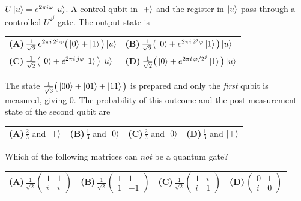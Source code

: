 \documentclass[11pt,a4paper]{article}
\newcommand{\optlabel}[1]{\textbf{(#1)}}
\newenvironment{qitem}[1]{\begin{list}{}{\setlength{\leftmargin}{3.3em}\setlength{\labelwidth}{3.1em}%
  \setlength{\labelsep}{0.2em}\setlength{\topsep}{3pt}\setlength{\parsep}{3pt}}\item[\textbf{Q.#1}\hfill]}{\end{list}}
\newcommand{\qsep}{\par\vspace{2pt}{\color{black!15}\hrule}\vspace{4pt}}
\begin{document}
\begin{qitem}{28}
$U\ket{u} = e^{2\pi i\varphi}\ket{u}$. A control qubit in $\ket{+}$ and the register in $\ket{u}$ pass through a
controlled-$U^{2^j}$ gate. The output state is
\par\smallskip\noindent\begin{tabularx}{\linewidth}{@{}*{2}{L}@{}}
\optlabel{A}\,$\frac{1}{\sqrt2}\,e^{2\pi i\,2^j\varphi}\big(\ket0 + \ket1\big)\ket{u}$ & \optlabel{B}\,$\frac{1}{\sqrt2}\big(\ket0 + e^{2\pi i\,2^j\varphi}\ket1\big)\ket{u}$ \\[3pt]
\optlabel{C}\,$\frac{1}{\sqrt2}\big(\ket0 + e^{2\pi i\,j\varphi}\ket1\big)\ket{u}$ & \optlabel{D}\,$\frac{1}{\sqrt2}\big(\ket0 + e^{2\pi i\,\varphi/2^j}\ket1\big)\ket{u}$
\end{tabularx}
\end{qitem}
\qsep

\begin{qitem}{29}
The state $\frac{1}{\sqrt3}\big(\ket{00} + \ket{01} + \ket{11}\big)$ is prepared and only the \emph{first} qubit is
measured, giving $0$. The probability of this outcome and the post-measurement state of the second qubit are
\par\smallskip\noindent\begin{tabularx}{\linewidth}{@{}*{4}{L}@{}}
\optlabel{A}\,$\frac23$ and $\ket{+}$ & \optlabel{B}\,$\frac13$ and $\ket{0}$ & \optlabel{C}\,$\frac23$ and $\ket{0}$ & \optlabel{D}\,$\frac13$ and $\ket{+}$
\end{tabularx}
\end{qitem}
\qsep

\begin{qitem}{30}
Which of the following matrices can \emph{not} be a quantum gate?
\par\smallskip\noindent\begin{tabularx}{\linewidth}{@{}*{4}{L}@{}}
\optlabel{A}\,$\frac{1}{\sqrt2}\begin{pmatrix}1&1\\ i&i\end{pmatrix}$ & \optlabel{B}\,$\frac{1}{\sqrt2}\begin{pmatrix}1&1\\ 1&-1\end{pmatrix}$ & \optlabel{C}\,$\frac{1}{\sqrt2}\begin{pmatrix}1&i\\ i&1\end{pmatrix}$ & \optlabel{D}\,$\begin{pmatrix}0&1\\ i&0\end{pmatrix}$
\end{tabularx}
\end{qitem}
\qsep
\end{document}
